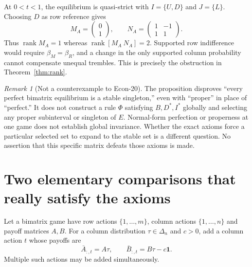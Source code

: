 \documentclass[11pt]{article}
\newcommand{\rank}{\operatorname{rank}}
\newcommand{\one}{\mathbf 1}
\theoremstyle{definition}
\theoremstyle{remark}
\newtheorem{remark}[theorem]{Remark}
\begin{document}
At $0<t<1$, the equilibrium is quasi-strict with $I=\{U,D\}$ and $J=\{L\}$.
Choosing $D$ as row reference gives
\[
 M_A=\begin{pmatrix}0\\1\end{pmatrix},\qquad
 N_A=\begin{pmatrix}1&-1\\1&1\end{pmatrix}.
\]
Thus $\rank M_A=1$ whereas $\rank[M_A\ N_A]=2$.
Supported row indifference would require $\beta_M=\beta_R$, and a change in
the only supported column probability cannot compensate unequal trembles.
This is precisely the obstruction in Theorem~\ref{thm:rank}.

\begin{remark}[Not a counterexample to Econ-20]
The proposition disproves ``every perfect bimatrix equilibrium is a stable
singleton,'' even with ``proper'' in place of ``perfect.'' It does not
construct a rule $\Phi$ satisfying $B,D^*,I^*$ globally and selecting any
proper subinterval or singleton of $E$. Normal-form perfection or properness
at one game does not establish global invariance. Whether the exact axioms
force a particular selected set to expand to the stable set is a different
question. No assertion that this specific matrix defeats those axioms is made.
\end{remark}


\section{Two elementary comparisons that really satisfy the axioms}
Let a bimatrix game have row actions $\{1,\ldots,m\}$, column actions
$\{1,\ldots,n\}$ and payoff matrices $A,B$. For a column distribution
$\tau\in\Delta_n$ and $c>0$, add a column action $t$ whose payoffs are
\begin{equation}\label{eq:penalized}
 \bar A_{:,t}=A\tau,\qquad
 \bar B_{:,t}=B\tau-c\one.
\end{equation}
Multiple such actions may be added simultaneously.
\end{document}
